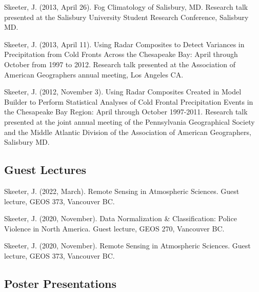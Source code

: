 \documentclass[
]{article}
\newlength{\cslhangindent}
\newlength{\cslentryspacingunit} %
\newenvironment{CSLReferences}[2] %
 {%
  \setlength{\parindent}{0pt}
  \ifodd #1
  \let\oldpar\par
  \def\par{\hangindent=\cslhangindent\oldpar}
  \fi
  \setlength{\parskip}{#2\cslentryspacingunit}
 }%
 {}
\begin{document}
\begin{CSLReferences}{1}{0}
\leavevmode{}%
Skeeter, J. (2013, April 26). Fog {Climatology} of {Salisbury}, {MD}.
Research talk presented at the Salisbury University Student Research
Conference, Salisbury MD.

\leavevmode{}%
Skeeter, J. (2013, April 11). Using {Radar} {Composites} to {Detect}
{Variances} in {Precipitation} from {Cold} {Fronts} {Across} the
{Chesapeake} {Bay}: {April} through {October} from 1997 to 2012.
Research talk presented at the Association of American Geographers
annual meeting, Los Angeles CA.

\leavevmode{}%
Skeeter, J. (2012, November 3). Using {Radar} {Composites} {Created} in
{Model} {Builder} to {Perform} {Statistical} {Analyses} of {Cold}
{Frontal} {Precipitation} {Events} in the {Chesapeake} {Bay} {Region}:
{April} through {October} 1997-2011. Research talk presented at the
joint annual meeting of the Pennsylvania Geographical Society and the
Middle Atlantic Division of the Association of American Geographers,
Salisbury MD.

\end{CSLReferences}

\hypertarget{guest-lectures}{%
\subsection{Guest Lectures}\label{guest-lectures}}

\hypertarget{refs-4.2}{}
\begin{CSLReferences}{1}{0}
\leavevmode{}%
Skeeter, J. (2022, March). Remote {Sensing} in {Atmospheric} {Sciences}.
Guest lecture, GEOS 373, Vancouver BC.

\leavevmode{}%
Skeeter, J. (2020, November). Data {Normalization} \& {Classification}:
{Police} {Violence} in {North} {America}. Guest lecture, GEOS 270,
Vancouver BC.

\leavevmode{}%
Skeeter, J. (2020, November). Remote {Sensing} in {Atmospheric}
{Sciences}. Guest lecture, GEOS 373, Vancouver BC.

\end{CSLReferences}

\hypertarget{poster-presentations}{%
\subsection{Poster Presentations}\label{poster-presentations}}
\end{document}
